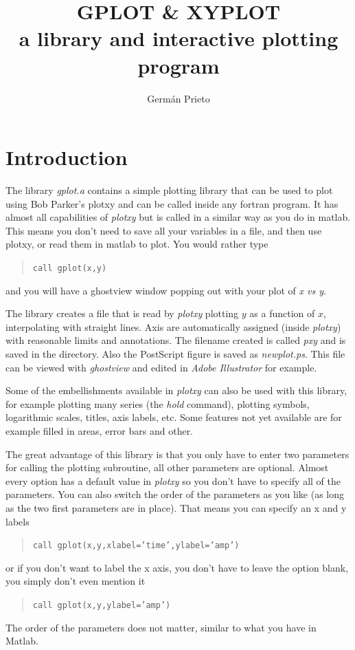 \documentclass{article}
\title{GPLOT \& XYPLOT \\
	a library and interactive plotting program}
\author{Germ\'{a}n Prieto}
\begin{document}

\maketitle

\section{Introduction}
The library {\it gplot.a} contains a simple plotting library that can be used to plot using Bob Parker's plotxy and can be called inside any fortran program. It has almost all capabilities of {\it plotxy} but is called in a similar way as you do in matlab. This means you don't need to save all your variables in a file, and then use plotxy, or read them in matlab to plot. You would rather type
\begin{quote}
\texttt{call gplot(x,y)}
\end{quote}
and you will have a ghostview window popping out with your plot of {\it x vs y}. 

The library creates a file that is read by {\it plotxy} plotting $y$ as a function of $x$, interpolating with straight lines. Axis are automatically assigned (inside {\it plotxy}) with reasonable limits and annotations. 
The filename created is called {\it pxy} and is saved in the directory. Also the PostScript figure is saved as {\it newplot.ps}. This file can be viewed with {\it ghostview} and edited in {\it Adobe Illustrator} for example. 

Some of the embellishments available in {\it plotxy} can also be used with this library, for example plotting many series (the {\it hold} command), plotting symbols, logarithmic scales, titles, axis labels, etc. Some features not yet available are for example filled in areas, error bars and other. 

The great advantage of this library is that you only have to enter two parameters for calling the plotting subroutine, all other parameters are optional. Almost every option has a default value in {\it plotxy} so you don't have to specify all of the parameters. You can also switch the order of the parameters as you like (as long as the two first parameters are in place). That means you can specify an x and y labels
\begin{quote}
\texttt{call gplot(x,y,xlabel='time',ylabel='amp')}
\end{quote}
or if you don't want to label the x axis, you don't have to leave the option blank, you simply don't even mention it
\begin{quote}
\texttt{call gplot(x,y,ylabel='amp')}
\end{quote}
The order of the parameters does not matter, similar to what you have in Matlab. 
\end{document}
